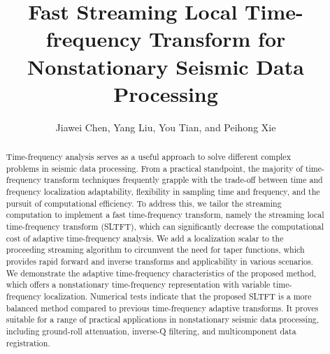 


\title{Fast Streaming Local Time-frequency Transform for Nonstationary Seismic Data Processing}

\renewcommand{\thefootnote}{\fnsymbol{footnote}}


\address{
\footnotemark[1] College of Geo-exploration Science and Technology,\\
Jilin University, Changchun, China }

\author{Jiawei Chen\footnotemark[1], Yang Liu\footnotemark[1], You Tian\footnotemark[1], and Peihong Xie\footnotemark[1]}


\maketitle

\begin{abstract}
	Time-frequency analysis serves as a useful approach to solve
	different complex problems in seismic data processing.  From a
	practical standpoint, the majority of time-frequency transform
	techniques frequently grapple with the trade-off between time
	and frequency localization adaptability, flexibility in
	sampling time and frequency, and the pursuit of computational
	efficiency.  To address this, we tailor the streaming
	computation to implement a fast time-frequency transform,
	namely the streaming local time-frequency transform (SLTFT),
	which can significantly decrease the computational cost of
	adaptive time-frequency analysis. We add a localization scalar
	to the proceeding streaming algorithm to circumvent the need
	for taper functions, which provides rapid forward and inverse
	transforms and applicability in various scenarios.  We
	demonstrate the adaptive time-frequency characteristics of the
	proposed method, which offers a nonstationary time-frequency
	representation with variable time-frequency
	localization. Numerical tests indicate that the proposed SLTFT
	is a more balanced method compared to previous time-frequency
	adaptive transforms. It proves suitable for a range of
	practical applications in nonstationary seismic data
	processing, including ground-roll attenuation, inverse-Q
	filtering, and multicomponent data registration.
\end{abstract}

